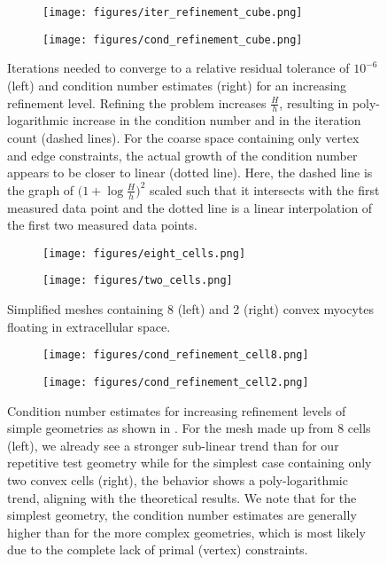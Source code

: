 \begin{figure}
    \centering
    \begin{subfigure}[b]{0.4\textwidth}
        \texttt{[image: figures/iter\_refinement\_cube.png]}
    \end{subfigure}
    \begin{subfigure}[b]{0.4\textwidth}
        \texttt{[image: figures/cond\_refinement\_cube.png]}
    \end{subfigure}
    \caption{Iterations needed to converge to a relative residual tolerance of $10^{-6}$ (left) and condition number estimates (right) for an increasing refinement level. Refining the problem increases $\frac{H}{h}$, resulting in poly-logarithmic increase in the condition number and in the iteration count (dashed lines). For the coarse space containing only vertex and edge constraints, the actual growth of the condition number appears to be closer to linear (dotted line). Here, the dashed line is the graph of $\bigg(1 + \log\frac{H}{h}\bigg)^2$ scaled such that it intersects with the first measured data point and the dotted line is a linear interpolation of the first two measured data points.}
    \label{fig:refinement}
\end{figure}

\begin{figure}
    \centering
    \begin{subfigure}[b]{0.4\textwidth}
        \texttt{[image: figures/eight\_cells.png]}
    \end{subfigure}
    \begin{subfigure}[b]{0.4\textwidth}
        \texttt{[image: figures/two\_cells.png]}
    \end{subfigure}
    \caption{Simplified meshes containing 8 (left) and 2 (right) convex myocytes floating in extracellular space.}
    \label{fig:simple-meshes}
\end{figure}

\begin{figure}
    \centering
    \begin{subfigure}[b]{0.4\textwidth}
        \texttt{[image: figures/cond\_refinement\_cell8.png]}
    \end{subfigure}
    \begin{subfigure}[b]{0.4\textwidth}
        \texttt{[image: figures/cond\_refinement\_cell2.png]}
    \end{subfigure}
    \caption{Condition number estimates for increasing refinement levels of simple geometries as shown in . For the mesh made up from 8 cells (left), we already see a stronger sub-linear trend than for our repetitive test geometry while for the simplest case containing only two convex cells (right), the behavior shows a poly-logarithmic trend, aligning with the theoretical results. We note that for the simplest geometry, the condition number estimates are generally higher than for the more complex geometries, which is most likely due to the complete lack of primal (vertex) constraints.}
    \label{fig:refinement-simple}
\end{figure}